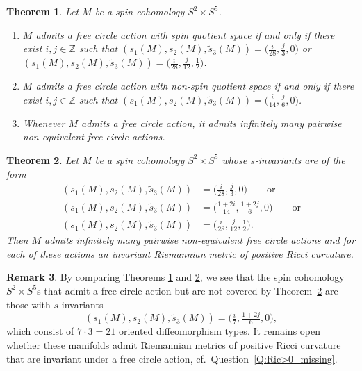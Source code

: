 \documentclass[10pt,a4paper]{amsart}
\numberwithin{equation}{section}
\newtheorem{Theorem}{Theorem}[section]
\theoremstyle{definition}
\newtheorem{Remark}[Theorem]{Remark}
\numberwithin{table}{section}
\newcommand{\Z}{\mathbb{Z}}
\begin{document}
\begin{Theorem}\label{T:free_circle_s}
	Let $M$ be a spin cohomology $S^2\times S^5$.
	\begin{enumerate}\itemsep=0pt
		\item[$(1)$] $M$ admits a free circle action with spin quotient space if and only if there exist $i,j\in\Z$ such that
$(s_1(M),s_2(M),\tilde{s}_3(M))=\bigl(\tfrac{i}{28}, \tfrac{j}{3},0 \bigr)$ or $(s_1(M),s_2(M),\tilde{s}_3(M))=\bigl(\tfrac{i}{28}, \tfrac{j}{12},\tfrac{1}{2} \bigr)$.
		\item[$(2)$] $M$ admits a free circle action with non-spin quotient space if and only if there exist $i,j\in\Z$ such that
$(s_1(M),s_2(M),\tilde{s}_3(M))=\bigl(\tfrac{i}{14}, \tfrac{j}{6},0 \bigr)$.
		\item[$(3)$] Whenever $M$ admits a free circle action, it admits infinitely many pairwise non-equivalent free circle actions.
	\end{enumerate}
\end{Theorem}

\begin{Theorem}\label{T:Ric>0_s}
	Let $M$ be a spin cohomology $S^2\times S^5$ whose $s$-invariants are of the form
	\begin{align*}
		(s_1(M),s_2(M),\tilde{s}_3(M))&= \bigl(\tfrac{i}{28}, \tfrac{j}{3},0 \bigr)\qquad\text{or}\\
		(s_1(M),s_2(M),\tilde{s}_3(M))&= \bigl(\tfrac{1+2i}{14}, \tfrac{1+2j}{6},0 \bigr)\qquad\text{or}\\
		(s_1(M),s_2(M),\tilde{s}_3(M))&= \bigl(\tfrac{i}{28}, \tfrac{j}{12},\tfrac{1}{2} \bigr).%
	\end{align*}
	Then $M$ admits infinitely many pairwise non-equivalent free circle actions and for each of these actions an invariant Riemannian metric of positive Ricci curvature.
\end{Theorem}

\begin{Remark}\label{R:Ric>0_missing}
	By comparing Theorems \ref{T:free_circle_s} and \ref{T:Ric>0_s}, we see that the spin cohomology $S^2\times S^5$s that admit a free circle action but are not covered by Theorem~\ref{T:Ric>0_s} are those with $s$-invariants
	\[ (s_1(M),s_2(M),\tilde{s}_3(M))=\bigl(\tfrac{i}{7},\tfrac{1+2j}{6},0\bigr), \]
	which consist of $7\cdot3=21$ oriented diffeomorphism types. It remains open whether these manifolds admit Riemannian metrics of positive Ricci curvature that are invariant under a free circle action, cf.\ Question~\ref{Q:Ric>0_missing}.
\end{Remark}
\end{document}
